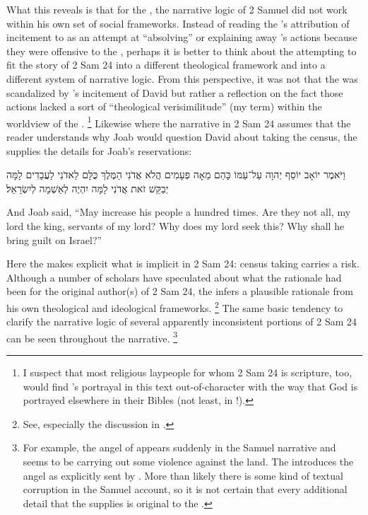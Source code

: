 What this reveals is that for the \chronicler, the narrative logic of 2 Samuel did not work within his own set of social frameworks. Instead of reading the \chronicler's attribution of incitement to  as an attempt at ``absolving'' or explaining away \yahweh's actions because they were offensive to the \chronicler, perhaps it is better to think about the \chronicler attempting to fit the story of 2 Sam 24 into a different theological framework and into a different system of narrative logic. From this perspective, it was not that the \chronicler was scandalized by \yahweh's incitement of David but rather a reflection on the fact those actions lacked a sort of ``theological verisimilitude'' (my term) within the worldview of the \chronicler.%
    \footnote{I suspect that most religious laypeople for whom 2 Sam 24 is scripture, too, would find \yahweh's portrayal in this text out-of-character with the way that God is portrayed elsewhere in their Bibles (not least, in \chronicles!).}
Likewise where the narrative in 2 Sam 24 assumes that the reader understands why Joab would question David about taking the census, the \chronicler supplies the details for Joab's reservations:
\begin{hebrewtext}
    וַיֹּאמֶר יוֹאָב יוֹסֵף יְהוָה עַל־עַמּוֹ כָּהֵם מֵאָה פְעָמִים הֲלֹא אֲדֹנִי הַמֶּלֶךְ כֻּלָּם לַאדֹנִי לַעֲבָדִים לָמָּה יְבַקֵּשׁ זֹאת אֲדֹנִי לָמָּה יִהְיֶה לְאַשְׁמָה לְיִשְׂרָאֵל׃
\end{hebrewtext}
\begin{translation}
    And Joab said, ``May \yahweh increase his people a hundred times. Are they not all, my lord the king, servants of my lord? Why does my lord seek this? Why shall he bring guilt on Israel?''
\end{translation}
\noindent
Here the \chronicler makes explicit what is implicit in 2 Sam 24: census taking carries a risk. Although a number of scholars have speculated about what the rationale had been for the original author(s) of 2 Sam 24, the \chronicler infers a plausible rationale from his own theological and ideological frameworks.%
    \footnote{See, especially the discussion in \cite[512--514]{mccarter1984}.}
The same basic tendency to clarify the narrative logic of several apparently inconsistent portions of 2 Sam 24 can be seen throughout the narrative.%
    \footnote{For example, the angel of \yahweh appears suddenly in the Samuel narrative and seems to be carrying out some violence against the land. The \chronicler introduces the angel as explicitly sent by \yahweh. More than likely there is some kind of textual corruption in the Samuel account, so it is not certain that every additional detail that the \chronicler supplies is original to the \chronicler.}

